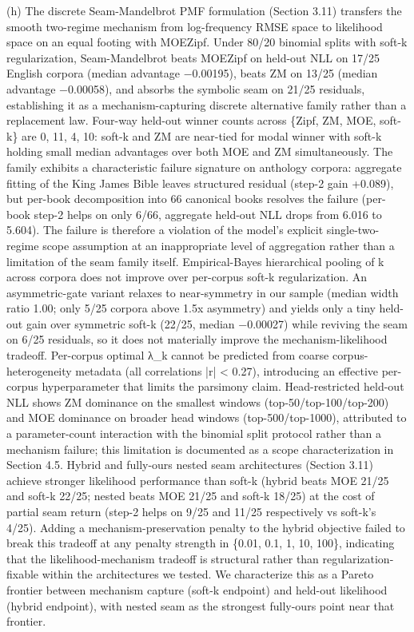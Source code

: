 \documentclass[11pt]{article}
\begin{document}
(h) The discrete Seam-Mandelbrot PMF formulation (Section 3.11) transfers the smooth two-regime mechanism from log-frequency RMSE space to likelihood space on an equal footing with MOEZipf. Under 80/20 binomial splits with soft-k regularization, Seam-Mandelbrot beats MOEZipf on held-out NLL on 17/25 English corpora (median advantage −0.00195), beats ZM on 13/25 (median advantage −0.00058), and absorbs the symbolic seam on 21/25 residuals, establishing it as a mechanism-capturing discrete alternative family rather than a replacement law. Four-way held-out winner counts across \{Zipf, ZM, MOE, soft-k\} are 0, 11, 4, 10: soft-k and ZM are near-tied for modal winner with soft-k holding small median advantages over both MOE and ZM simultaneously. The family exhibits a characteristic failure signature on anthology corpora: aggregate fitting of the King James Bible leaves structured residual (step-2 gain +0.089), but per-book decomposition into 66 canonical books resolves the failure (per-book step-2 helps on only 6/66, aggregate held-out NLL drops from 6.016 to 5.604). The failure is therefore a violation of the model's explicit single-two-regime scope assumption at an inappropriate level of aggregation rather than a limitation of the seam family itself. Empirical-Bayes hierarchical pooling of k across corpora does not improve over per-corpus soft-k regularization. An asymmetric-gate variant relaxes to near-symmetry in our sample (median width ratio 1.00; only 5/25 corpora above 1.5x asymmetry) and yields only a tiny held-out gain over symmetric soft-k (22/25, median −0.00027) while reviving the seam on 6/25 residuals, so it does not materially improve the mechanism-likelihood tradeoff. Per-corpus optimal λ\_k cannot be predicted from coarse corpus-heterogeneity metadata (all correlations |r| < 0.27), introducing an effective per-corpus hyperparameter that limits the parsimony claim. Head-restricted held-out NLL shows ZM dominance on the smallest windows (top-50/top-100/top-200) and MOE dominance on broader head windows (top-500/top-1000), attributed to a parameter-count interaction with the binomial split protocol rather than a mechanism failure; this limitation is documented as a scope characterization in Section 4.5. Hybrid and fully-ours nested seam architectures (Section 3.11) achieve stronger likelihood performance than soft-k (hybrid beats MOE 21/25 and soft-k 22/25; nested beats MOE 21/25 and soft-k 18/25) at the cost of partial seam return (step-2 helps on 9/25 and 11/25 respectively vs soft-k's 4/25). Adding a mechanism-preservation penalty to the hybrid objective failed to break this tradeoff at any penalty strength in \{0.01, 0.1, 1, 10, 100\}, indicating that the likelihood-mechanism tradeoff is structural rather than regularization-fixable within the architectures we tested. We characterize this as a Pareto frontier between mechanism capture (soft-k endpoint) and held-out likelihood (hybrid endpoint), with nested seam as the strongest fully-ours point near that frontier.
\end{document}
